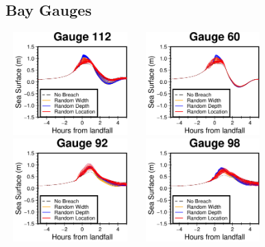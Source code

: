 \subsection{Bay Gauges}
\includegraphics[width=5cm, height=4cm]{images/gauges/bay_112.png}
\includegraphics[width=5cm, height=4cm]{images/gauges/bay_60.png}
\includegraphics[width=5cm, height=4cm]{images/gauges/bay_92.png}
\includegraphics[width=5cm, height=4cm]{images/gauges/bay_98.png}
